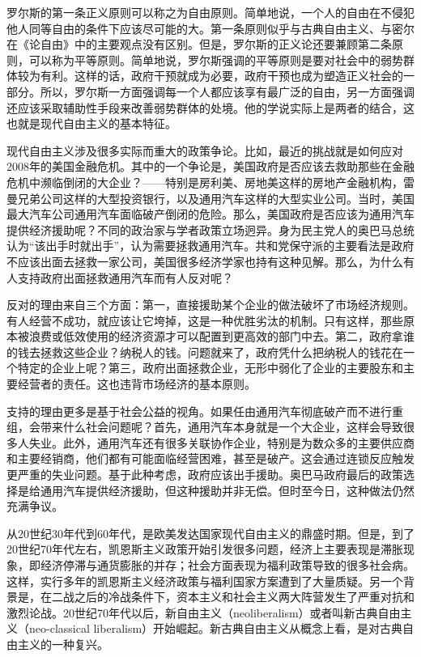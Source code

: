 罗尔斯的第一条正义原则可以称之为自由原则。简单地说，一个人的自由在不侵犯他人同等自由的条件下应该尽可能的大。第一条原则似乎与古典自由主义、与密尔在《论自由》中的主要观点没有区别。但是，罗尔斯的正义论还要兼顾第二条原则，可以称为平等原则。简单地说，罗尔斯强调的平等原则是要对社会中的弱势群体较为有利。这样的话，政府干预就成为必要，政府干预也成为塑造正义社会的一部分。所以，罗尔斯一方面强调每一个人都应该享有最广泛的自由，另一方面强调还应该采取辅助性手段来改善弱势群体的处境。他的学说实际上是两者的结合，这也就是现代自由主义的基本特征。

现代自由主义涉及很多实际而重大的政策争论。比如，最近的挑战就是如何应对2008年的美国金融危机。其中的一个争论是，美国政府是否应该去救助那些在金融危机中濒临倒闭的大企业？——特别是房利美、房地美这样的房地产金融机构，雷曼兄弟公司这样的大型投资银行，以及通用汽车这样的大型实业公司。当时，美国最大汽车公司通用汽车面临破产倒闭的危险。那么，美国政府是否应该为通用汽车提供经济援助呢？不同的政治家与学者政策立场迥异。身为民主党人的奥巴马总统认为“该出手时就出手”，认为需要拯救通用汽车。共和党保守派的主要看法是政府不应该出面去拯救一家公司，美国很多经济学家也持有这种见解。那么，为什么有人支持政府出面拯救通用汽车而有人反对呢？

反对的理由来自三个方面：第一，直接援助某个企业的做法破坏了市场经济规则。有人经营不成功，就应该让它垮掉，这是一种优胜劣汰的机制。只有这样，那些原本被浪费或低效使用的经济资源才可以配置到更高效的部门中去。第二，政府拿谁的钱去拯救这些企业？纳税人的钱。问题就来了，政府凭什么把纳税人的钱花在一个特定的企业上呢？第三，政府出面拯救企业，无形中弱化了企业的主要股东和主要经营者的责任。这也违背市场经济的基本原则。

支持的理由更多是基于社会公益的视角。如果任由通用汽车彻底破产而不进行重组，会带来什么社会问题呢？首先，通用汽车本身就是一个大企业，这样会导致很多人失业。此外，通用汽车还有很多关联协作企业，特别是为数众多的主要供应商和主要经销商，他们都有可能面临经营困难，甚至是破产。这会通过连锁反应触发更严重的失业问题。基于此种考虑，政府应该出手援助。奥巴马政府最后的政策选择是给通用汽车提供经济援助，但这种援助并非无偿。但时至今日，这种做法仍然充满争议。


从20世纪30年代到60年代，是欧美发达国家现代自由主义的鼎盛时期。但是，到了20世纪70年代左右，凯恩斯主义政策开始引发很多问题，经济上主要表现是滞胀现象，即经济停滞与通货膨胀的并存；社会方面表现为福利政策导致的很多社会病。这样，实行多年的凯恩斯主义经济政策与福利国家方案遭到了大量质疑。另一个背景是，在二战之后的冷战条件下，资本主义和社会主义两大阵营发生了严重对抗和激烈论战。20世纪70年代以后，新自由主义（neoliberalism）或者叫新古典自由主义（neo-classical liberalism）开始崛起。新古典自由主义从概念上看，是对古典自由主义的一种复兴。

